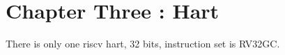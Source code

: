 \newpage
\section{Chapter Three : Hart}
There is only one riscv hart, 32 bits, instruction set is RV32GC.
